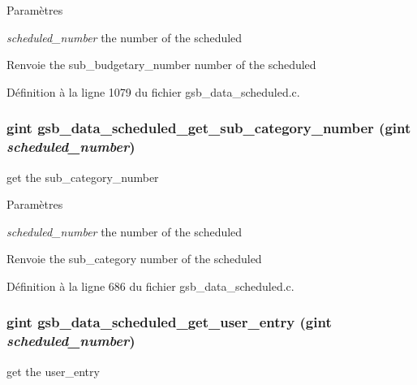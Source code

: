 \begin{DoxyParams}{Paramètres}
\item[{\em scheduled\_\-number}]the number of the scheduled\end{DoxyParams}
\begin{DoxyReturn}{Renvoie}
the sub\_\-budgetary\_\-number number of the scheduled 
\end{DoxyReturn}


Définition à la ligne 1079 du fichier gsb\_\-data\_\-scheduled.c.

\subsubsection[{gsb\_\-data\_\-scheduled\_\-get\_\-sub\_\-category\_\-number}]{\setlength{\rightskip}{0pt plus 5cm}gint gsb\_\-data\_\-scheduled\_\-get\_\-sub\_\-category\_\-number (gint {\em scheduled\_\-number})}\label{gsb__data__scheduled_8c_a0f906373715193111c3dd1d6af30000a}
get the sub\_\-category\_\-number


\begin{DoxyParams}{Paramètres}
\item[{\em scheduled\_\-number}]the number of the scheduled\end{DoxyParams}
\begin{DoxyReturn}{Renvoie}
the sub\_\-category number of the scheduled 
\end{DoxyReturn}


Définition à la ligne 686 du fichier gsb\_\-data\_\-scheduled.c.

\subsubsection[{gsb\_\-data\_\-scheduled\_\-get\_\-user\_\-entry}]{\setlength{\rightskip}{0pt plus 5cm}gint gsb\_\-data\_\-scheduled\_\-get\_\-user\_\-entry (gint {\em scheduled\_\-number})}\label{gsb__data__scheduled_8c_a7d7cfb1bc2ca105b20b5627c94981096}
get the user\_\-entry


